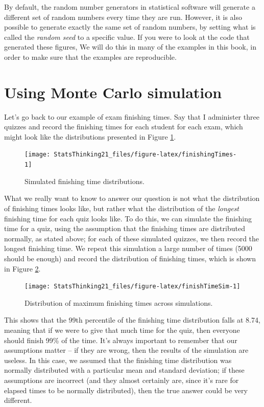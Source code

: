 \documentclass[12pt,]{book}
\theoremstyle{definition}
\theoremstyle{definition}
\theoremstyle{definition}
\theoremstyle{remark}
\begin{document}
By default, the random number generators in statistical software will generate a different set of random numbers every time they are run. However, it is also possible to generate exactly the same set of random numbers, by setting what is called the \emph{random seed} to a specific value. If you were to look at the code that generated these figures, We will do this in many of the examples in this book, in order to make sure that the examples are reproducible.

\hypertarget{using-monte-carlo-simulation}{%
\section{Using Monte Carlo simulation}\label{using-monte-carlo-simulation}}

Let's go back to our example of exam finishing times. Say that I administer three quizzes and record the finishing times for each student for each exam, which might look like the distributions presented in Figure \ref{fig:finishingTimes}.

\begin{figure}
\texttt{[image: StatsThinking21\_files/figure-latex/finishingTimes-1]} \caption{Simulated finishing time distributions.}\label{fig:finishingTimes}
\end{figure}

What we really want to know to answer our question is not what the distribution of finishing times looks like, but rather what the distribution of the \emph{longest} finishing time for each quiz looks like. To do this, we can simulate the finishing time for a quiz, using the assumption that the finishing times are distributed normally, as stated above; for each of these simulated quizzes, we then record the longest finishing time. We repeat this simulation a large number of times (5000 should be enough) and record the distribution of finishing times, which is shown in Figure \ref{fig:finishTimeSim}.

\begin{figure}
\texttt{[image: StatsThinking21\_files/figure-latex/finishTimeSim-1]} \caption{Distribution of maximum finishing times across simulations.}\label{fig:finishTimeSim}
\end{figure}

This shows that the 99th percentile of the finishing time distribution falls at 8.74, meaning that if we were to give that much time for the quiz, then everyone should finish 99\% of the time. It's always important to remember that our assumptions matter -- if they are wrong, then the results of the simulation are useless. In this case, we assumed that the finishing time distribution was normally distributed with a particular mean and standard deviation; if these assumptions are incorrect (and they almost certainly are, since it's rare for elapsed times to be normally distributed), then the true answer could be very different.
\end{document}
